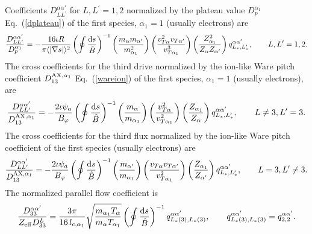 \documentclass[preprint,prb,aps]{revtex4-1}
\newcommand{\be}[1]{\begin{equation} \label{#1}}
\newcommand{\ee}{\end{equation}}
\newcommand{\eq}[1]{(\ref{#1})}
\newcommand{\rd}{{\rm d}}
\begin{document}
Coefficients $D_{LL^\prime}^{\alpha \alpha'}$ for $L,L^\prime=1,2$ normalized by the plateau value
$D_p^{\alpha_1}$ Eq.~\eq{dplateau} of the first species, $\alpha_1=1$ (usually electrons)
are
\be{multispec:platnorm}
\frac{D_{LL^\prime}^{\alpha \alpha'}}{D_p^{\alpha_1}}=
-\frac{16\iota R}{\pi\langle|\nabla s|\rangle^2}
\left(\oint \frac{\rd s}{\hat B}\right)^{-1}
\left(\frac{m_\alpha m_{\alpha'}}{m_{\alpha_1}^2}\right)
\left(\frac{v_{T \alpha}^2 v_{T \alpha'}}{v_{T \alpha_1}^3}\right)
\left(\frac{Z_{\alpha_1}^2} {Z_\alpha Z_{\alpha'}}\right)
q_{L_\ast,L_\ast^\prime}^{\alpha \alpha'}, \qquad L,L^\prime=1,2.
\ee
The cross coefficients for the third drive normalized by the ion-like Ware pitch coefficient
$D_{13}^{{\rm AX},\alpha_1}$ Eq.~\eq{wareion} of the first species, $\alpha_1=1$ (usually electrons),
are
\be{multispec:warenorm}
\frac{D_{LL^\prime}^{\alpha \alpha'}}{D_{13}^{{\rm AX},\alpha_1}}=
-\frac{2\iota \psi_a}{B_\varphi}
\left(\oint \frac{\rd s}{\hat B}\right)^{-1}
\left(\frac{m_\alpha}{m_{\alpha_1}}\right)
\left(\frac{v_{T \alpha}^2}{v_{T \alpha_1}^2}\right)
\left(\frac{Z_{\alpha_1}} {Z_\alpha}\right)
q_{L_\ast,L_\ast^\prime}^{\alpha \alpha'}, \qquad L\ne 3, L^\prime=3.
\ee
The cross coefficients for the third flux normalized by the ion-like Ware pitch coefficient
of the first species (usually electrons) are
\be{multispec:bootstrapnorm}
\frac{D_{LL^\prime}^{\alpha \alpha'}}{D_{13}^{{\rm AX},\alpha_1}}=
-\frac{2\iota \psi_a}{B_\varphi}
\left(\oint \frac{\rd s}{\hat B}\right)^{-1}
\left(\frac{m_{\alpha'}}{m_{\alpha_1}}\right)
\left(\frac{v_{T \alpha} v_{T \alpha'}}{v_{T \alpha_1}^2}\right)
\left(\frac{Z_{\alpha_1}} {Z_{\alpha'}}\right)
q_{L_\ast,L_\ast^\prime}^{\alpha \alpha'}, \qquad L= 3, L^\prime \ne 3.
\ee
The normalized parallel flow coefficient is
\be{multispec:D33norm}
\frac{D^{\alpha \alpha'}_{33}}{Z_{\rm eff} D_{33}^{L}}=\frac{3\pi}{16\, l_{c,\alpha_1}}
\sqrt{\frac{m_{\alpha_1} T_\alpha}{m_\alpha T_{\alpha_1}}}
\left(\oint \frac{\rd s}{\hat B}\right)^{-1}q_{L_\ast(3),L_\ast(3)}^{\alpha \alpha'},
\qquad q_{L_\ast(3),L_\ast(3)}^{\alpha \alpha'}=q_{2,2}^{\alpha \alpha'}.
\ee

\end{document}
